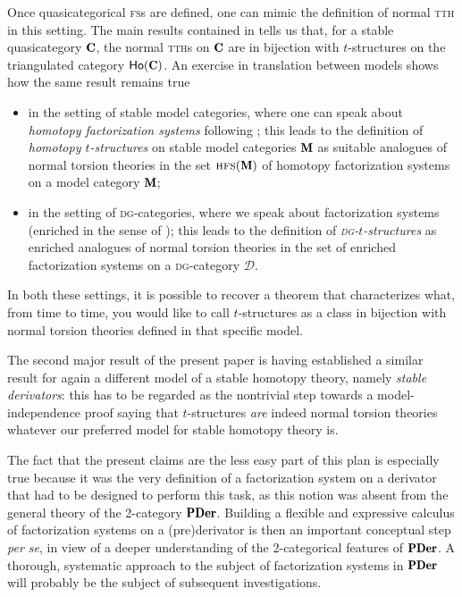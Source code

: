 Once quasicategorical \textsc{fs}s are defined, one can mimic the definition of normal \textsc{tth} in this setting. The main results contained in \cite{tstructures} tells us that, for a stable quasicategory $\C$, the normal \textsc{tth}s on $\C$ are in bijection with $t$-structures on the triangulated category $\ho(\C)$.
An exercise in translation between models shows how the same result remains true
\begin{itemize}
\item in the setting of stable model categories, where one can speak about \emph{homotopy factorization systems} following \cite{bousfield1977constructions,Joy}; this leads to the definition of  \emph{homotopy $t$\hyp{}structures} on stable model categories $\cate{M}$ as suitable analogues of normal torsion theories in the set $\textsc{hfs}(\cate{M})$ of homotopy factorization systems on a model category $\cate{M}$;
\item in the setting of \textsc{dg}\hyp{}categories, where we speak about factorization systems (enriched in the sense of \cite{Day1974,enrichFS}); this leads to the definition of \emph{\textsc{dg}\hyp{}$t$\hyp{}structures} as enriched analogues of normal torsion theories in the set of enriched factorization systems on a \textsc{dg}\hyp{}category $\mathcal D$.
\end{itemize}
In both these settings, it is possible to recover a theorem that characterizes what, from time to time, you would like to call $t$-structures as a class in bijection with normal torsion theories defined in that specific model.

The second major result of the present paper is having established a similar result for again a different model of a stable homotopy theory, namely \emph{stable derivators}: this has to be regarded as the nontrivial step towards a model\hyp{}independence proof saying that $t$-structures \emph{are} indeed normal torsion theories whatever our preferred model for stable homotopy theory is.

The fact that the present claims are the less easy part of this plan is especially true because  it was the very definition of a factorization system on a derivator that had to be designed to perform this task, as this notion was absent from the general theory of the 2\hyp{}category $\PDer$. Building a flexible and expressive calculus of factorization systems on a (pre)derivator is then an important conceptual step \emph{per se}, in view of a deeper understanding of the 2\hyp{}categorical features of $\PDer$. A thorough, systematic approach to the subject of factorization systems in $\PDer$ will probably be the subject of subsequent investigations.

